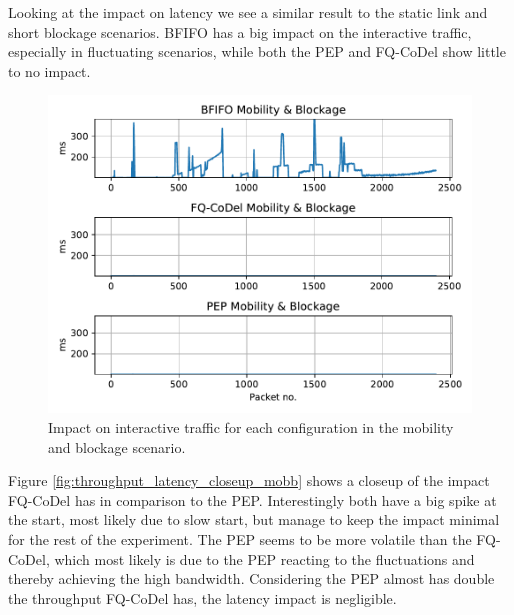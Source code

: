 \documentclass[a4paper,english, 12pt]{report}
\begin{document}
Looking at the impact on latency we see a similar result to the static link and short blockage scenarios. BFIFO has a big impact on the interactive traffic, especially in fluctuating scenarios, while both the PEP and FQ-CoDel show little to no impact.\\

\begin{figure}[!h!] %
	\centering
	\includegraphics[scale=0.70]{../diagrams/witestlab/throughput/latency_mobb.pdf}
  	\caption{Impact on interactive traffic for each configuration in the mobility and blockage scenario.}
  	\label{fig:latency_mobb}
\end{figure}

Figure \ref{fig:throughput_latency_closeup_mobb} shows a closeup of the impact FQ-CoDel has in comparison to the PEP. Interestingly both have a big spike at the start, most likely due to slow start, but manage to keep the impact minimal for the rest of the experiment. The PEP seems to be more volatile than the FQ-CoDel, which most likely is due to the PEP reacting to the fluctuations and thereby achieving the high bandwidth. Considering the PEP almost has double the throughput FQ-CoDel has, the latency impact is negligible.\\
\end{document}
